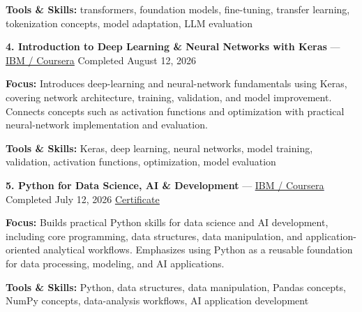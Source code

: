\documentclass[9pt,letterpaper]{extarticle}
\begin{document}
{\small\textbf{Tools \& Skills:} transformers, foundation models, fine-tuning, transfer learning, tokenization concepts, model adaptation, LLM evaluation\par}
\vspace{2pt}
\noindent\textbf{4. Introduction to Deep Learning \& Neural Networks with Keras} {\small --- \textcolor{blue}{\underline{\href{https://www.coursera.org/account/accomplishments/verify/Y6NP4GWLS4DZ}{IBM / Coursera}}} \textbar{} Completed \textbar{} August 12, 2026}\par
\textbf{Focus:} Introduces deep-learning and neural-network fundamentals using Keras, covering network architecture, training, validation, and model improvement. Connects concepts such as activation functions and optimization with practical neural-network implementation and evaluation.\par
{\small\textbf{Tools \& Skills:} Keras, deep learning, neural networks, model training, validation, activation functions, optimization, model evaluation\par}
\vspace{2pt}
\noindent\textbf{5. Python for Data Science, AI \& Development} {\small --- \textcolor{blue}{\underline{\href{https://www.coursera.org/account/accomplishments/verify/WRA89JEJU8EE}{IBM / Coursera}}} \textbar{} Completed \textbar{} July 12, 2026 \textbar{} \textcolor{blue}{\underline{\href{https://waseemraza844.github.io/portfolio/certificates/cloud-devops/C7. Coursera WRA89JEJU8EE.pdf}{Certificate}}}}\par
\textbf{Focus:} Builds practical Python skills for data science and AI development, including core programming, data structures, data manipulation, and application-oriented analytical workflows. Emphasizes using Python as a reusable foundation for data processing, modeling, and AI applications.\par
{\small\textbf{Tools \& Skills:} Python, data structures, data manipulation, Pandas concepts, NumPy concepts, data-analysis workflows, AI application development\par}
\vspace{2pt}
\end{document}
